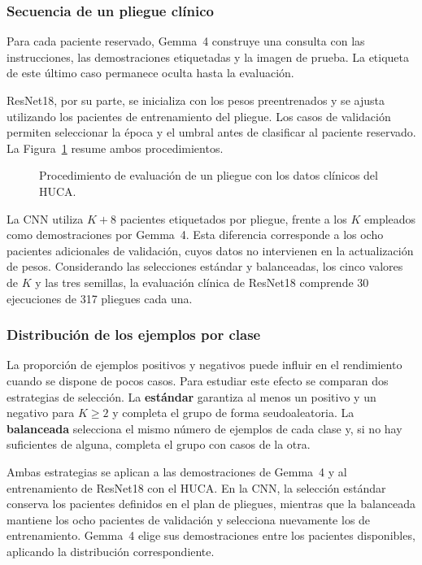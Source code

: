 \clearpage
\subsubsection{Secuencia de un pliegue clínico}

Para cada paciente reservado, Gemma~4 construye una consulta con las instrucciones, las demostraciones etiquetadas y la imagen de prueba. La etiqueta de este último caso permanece oculta hasta la evaluación.

ResNet18, por su parte, se inicializa con los pesos preentrenados y se ajusta utilizando los pacientes de entrenamiento del pliegue. Los casos de validación permiten seleccionar la época y el umbral antes de clasificar al paciente reservado. La Figura~\ref{fig:clinical_fold_protocol} resume ambos procedimientos.

\begin{figure}[H]
  \centering
  \caption{Procedimiento de evaluación de un pliegue con los datos clínicos del HUCA.}
  \label{fig:clinical_fold_protocol}
\end{figure}

La CNN utiliza \(K+8\) pacientes etiquetados por pliegue, frente a los \(K\) empleados como demostraciones por Gemma~4. Esta diferencia corresponde a los ocho pacientes adicionales de validación, cuyos datos no intervienen en la actualización de pesos. Considerando las selecciones estándar y balanceadas, los cinco valores de \(K\) y las tres semillas, la evaluación clínica de ResNet18 comprende 30 ejecuciones de 317 pliegues cada una.

\subsubsection{Distribución de los ejemplos por clase}
\label{sec:condiciones_vlm}
\label{sec:origen_contexto_vlm}

La proporción de ejemplos positivos y negativos puede influir en el rendimiento cuando se dispone de pocos casos. Para estudiar este efecto se comparan dos estrategias de selección. La \textbf{estándar} garantiza al menos un positivo y un negativo para \(K\geq2\) y completa el grupo de forma seudoaleatoria. La \textbf{balanceada} selecciona el mismo número de ejemplos de cada clase y, si no hay suficientes de alguna, completa el grupo con casos de la otra.

\begin{samepage}
Ambas estrategias se aplican a las demostraciones de Gemma~4 y al entrenamiento de ResNet18 con el HUCA. En la CNN, la selección estándar conserva los pacientes definidos en el plan de pliegues, mientras que la balanceada mantiene los ocho pacientes de validación y selecciona nuevamente los de entrenamiento. Gemma~4 elige sus demostraciones entre los pacientes disponibles, aplicando la distribución correspondiente.
\par
\end{samepage}

